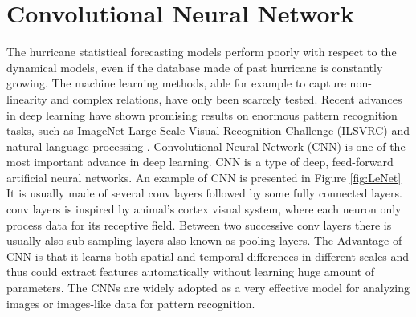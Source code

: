 \section{Convolutional Neural Network}
The hurricane statistical forecasting models perform poorly with respect to the dynamical models, even if the database made of past hurricane is constantly growing. The machine learning methods, able for example to capture non-linearity and complex relations, have only been scarcely tested. Recent advances in deep learning have shown promising results on enormous pattern recognition tasks, such as ImageNet Large Scale Visual Recognition Challenge (ILSVRC) \cite{russakovsky2015imagenet} \cite{krizhevsky2012imagenet}  \cite{szegedy2015going} and natural language processing \cite{goldberg2014word2vec} \cite{sutskever2014sequence}. Convolutional Neural Network (CNN) is one of the most important advance in deep learning. CNN is a type of deep, feed-forward artificial neural networks. An example of CNN is presented in Figure \ref{fig:LeNet} It is usually made of several conv layers followed by some fully connected layers. conv layers is inspired by animal's cortex visual system, where each neuron only process data for its receptive field. Between two successive conv layers there is usually also sub-sampling layers also known as pooling layers. The Advantage of CNN is that it learns both spatial and temporal differences in different scales and thus could extract features automatically without learning huge amount of parameters. The CNNs are widely adopted as a very effective model for analyzing images or images-like data for pattern recognition. 

